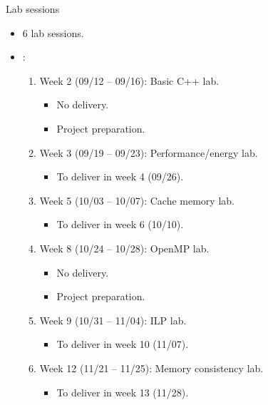 \begin{frame}[t]{Lab sessions}
\begin{itemize}
  \item 6 lab sessions.

  \vfill
  \item {}:
    \begin{enumerate}
      \item Week 2 (09/12 -- 09/16): Basic C++ lab.
        \begin{itemize}
          \item No delivery.
          \item Project preparation.
        \end{itemize}
      \item Week 3 (09/19 -- 09/23): Performance/energy lab.
        \begin{itemize}
          \item To deliver in week 4 (09/26).
        \end{itemize}
      \item Week 5 (10/03 -- 10/07): Cache memory lab.
        \begin{itemize}
          \item To deliver in week 6 (10/10).
        \end{itemize}
      \item Week 8 (10/24 -- 10/28): OpenMP lab.
        \begin{itemize}
          \item No delivery.
          \item Project preparation.
        \end{itemize}
      \item Week 9 (10/31 -- 11/04): ILP lab.
        \begin{itemize}
          \item To deliver in week 10 (11/07).
        \end{itemize}
      \item Week 12 (11/21 -- 11/25): Memory consistency lab.
        \begin{itemize}
          \item To deliver in week 13 (11/28).
        \end{itemize}
    \end{enumerate}
\end{itemize}
\end{frame}

